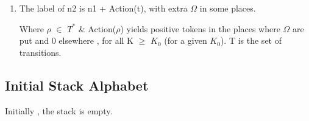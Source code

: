 \documentclass[a4paper,10pt]{article}
\begin{document}
\begin{enumerate}
\begin{center}
      \end{center} 
   
   
   
   
   
   
   
   
   
   
   
   
   
   
   \item
      The label of n2 is n1 + Action(t), with extra $\Omega$ in some places. 
      
      \begin{center}

      \end{center}
       Where $\rho$ $\in$ $T^{\ast}$ \& Action($\rho$) yields positive tokens in the 
       places where $\Omega$ are put and 0 elsewhere , \newline 
       for all K $\geq$ $K_{0}$ (for a given $K_{0}$).
       \newline
       T is the set of transitions. 
      
       \end{enumerate}
   
   
   \subsection{Initial Stack Alphabet}
    Initially , the stack is empty.    

    
    
\end{document}
